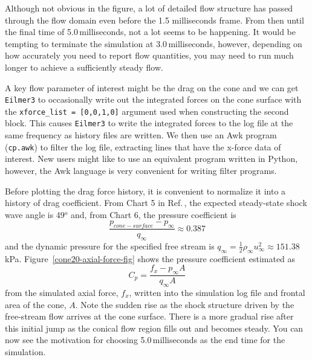 \medskip
Although not obvious in the figure, a lot of detailed flow structure has passed through the flow domain
even before the 1.5 milliseconds frame.
From then until the final time of 5.0\,milliseconds, not a lot seems to be happening.
It would be tempting to terminate the simulation at 3.0\,milliseconds, however, 
depending on how accurately you need to report flow quantities, you may need to run much longer 
to achieve a sufficiently steady flow.

\medskip
A key flow parameter of interest might be the drag on the cone and we can get \verb!Eilmer3! to
occasionally write out the integrated forces on the cone surface with the \verb!xforce_list = [0,0,1,0]!
argument used when constructing the second block.
This causes \verb!Eilmer3! to write the integrated forces to the log file 
at the same frequency as history files are written.
We then use an Awk program (\verb!cp.awk!) to filter the log file, 
extracting lines that have the x-force data of interest.
New users might like to use an equivalent program written in Python, 
however, the Awk language is very convenient for writing filter programs.

\noindent \topbar
{}
\bottombar
      
\medskip
Before plotting the drag force history, 
it is convenient to normalize it into a history of drag coefficient.
From Chart 5 in Ref.\,\cite{ames_53}, the expected steady-state shock wave
angle is 49$^o$ and, from Chart 6, the pressure coefficient is
$$
\frac{p_{cone-surface} - p_{\infty}}{q_{\infty}} \approx 0.387
$$
and the dynamic pressure for the specified free stream is
$q_{\infty} = \frac{1}{2} \rho_{\infty} u_{\infty}^2 \approx 151.38$\,kPa.
Figure~\ref{cone20-axial-force-fig} shows the pressure coefficient 
estimated as
$$
C_p = \frac{f_x - p_{\infty} A}{q_{\infty} A}
$$
from the simulated axial force, $f_x$, written into the simulation log file
and frontal area of the cone, $A$.
Note the sudden rise as the shock structure driven by the free-stream flow
arrives at the cone surface.
There is a more gradual rise after this initial jump as the conical flow region
fills out and becomes steady.
You can now see the motivation for choosing 5.0\,milliseconds as the end time
for the simulation.

